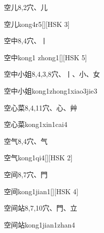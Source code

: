 \begin{entry}{空儿}{8,2}{⽳、⼉}
  \begin{phonetics}{空儿}{kong4r5}[][HSK 3]
  \end{phonetics}
\end{entry}

\begin{entry}{空中}{8,4}{⽳、⼁}
  \begin{phonetics}{空中}{kong1 zhong1}[][HSK 5]
  \end{phonetics}
\end{entry}

\begin{entry}{空中小姐}{8,4,3,8}{⽳、⼁、⼩、⼥}
  \begin{phonetics}{空中小姐}{kong1zhong1xiao3jie3}
  \end{phonetics}
\end{entry}

\begin{entry}{空心菜}{8,4,11}{⽳、⼼、⾋}
  \begin{phonetics}{空心菜}{kong1xin1cai4}
  \end{phonetics}
\end{entry}

\begin{entry}{空气}{8,4}{⽳、⽓}
  \begin{phonetics}{空气}{kong1qi4}[][HSK 2]
  \end{phonetics}
\end{entry}

\begin{entry}{空间}{8,7}{⽳、⾨}
  \begin{phonetics}{空间}{kong1jian1}[][HSK 4]
  \end{phonetics}
\end{entry}

\begin{entry}{空间站}{8,7,10}{⽳、⾨、⽴}
  \begin{phonetics}{空间站}{kong1jian1zhan4}
  \end{phonetics}
\end{entry}

